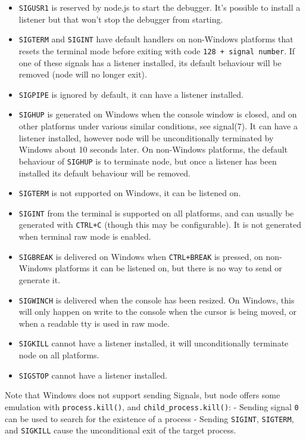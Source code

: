 \begin{itemize}
\itemsep1pt\parskip0pt
\item
  \texttt{SIGUSR1} is reserved by node.js to start the debugger. It's
  possible to install a listener but that won't stop the debugger from
  starting.
\item
  \texttt{SIGTERM} and \texttt{SIGINT} have default handlers on
  non-Windows platforms that resets the terminal mode before exiting
  with code \texttt{128\ +\ signal\ number}. If one of these signals has
  a listener installed, its default behaviour will be removed (node will
  no longer exit).
\item
  \texttt{SIGPIPE} is ignored by default, it can have a listener
  installed.
\item
  \texttt{SIGHUP} is generated on Windows when the console window is
  closed, and on other platforms under various similar conditions, see
  signal(7). It can have a listener installed, however node will be
  unconditionally terminated by Windows about 10 seconds later. On
  non-Windows platforms, the default behaviour of \texttt{SIGHUP} is to
  terminate node, but once a listener has been installed its default
  behaviour will be removed.
\item
  \texttt{SIGTERM} is not supported on Windows, it can be listened on.
\item
  \texttt{SIGINT} from the terminal is supported on all platforms, and
  can usually be generated with \texttt{CTRL+C} (though this may be
  configurable). It is not generated when terminal raw mode is enabled.
\item
  \texttt{SIGBREAK} is delivered on Windows when \texttt{CTRL+BREAK} is
  pressed, on non-Windows platforms it can be listened on, but there is
  no way to send or generate it.
\item
  \texttt{SIGWINCH} is delivered when the console has been resized. On
  Windows, this will only happen on write to the console when the cursor
  is being moved, or when a readable tty is used in raw mode.
\item
  \texttt{SIGKILL} cannot have a listener installed, it will
  unconditionally terminate node on all platforms.
\item
  \texttt{SIGSTOP} cannot have a listener installed.
\end{itemize}

Note that Windows does not support sending Signals, but node offers some
emulation with \texttt{process.kill()}, and
\texttt{child\_process.kill()}: - Sending signal \texttt{0} can be used
to search for the existence of a process - Sending \texttt{SIGINT},
\texttt{SIGTERM}, and \texttt{SIGKILL} cause the unconditional exit of
the target process.

